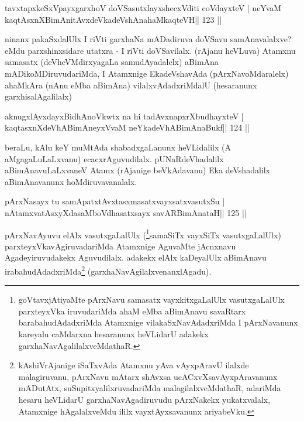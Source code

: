 \begin{shl}
tavxtapxkeSxV\s payxgarxhoV doVSasutxlayxshecxVditi coVdayxteV |
neYvaM kaqtAsxnXBimAnitAvxdeVkadeVshAnahaMkaqteVH\hfill || 123 ||
\end{shl}

\begin{artha}
ninanx pakaSxdalUlx I riVti garxhaNa mADadiruva doVSavu samAnavalalxve? eMdu parxshinxsidare utatxra - I riVti doVSavilalx. (rAjanu heVLuva) Atamxnu samasatx (deVheVMdirxyagaLa samudAyadalelx) aBimAna mADikoMDiruvudariMda, I Atamxnige EkadeVshavAda (pArxNavoMdaralelx) ahaMkAra (nAnu eMba aBimAna) vilalxvAdadxriMdalU (hesaranunx garxhisalAgalilalx) 
\end{artha} 


\begin{shl}
aknugxlAyxdayxBidhAnoVkwtx na hi tadAvxnapxrXbudhayxteV |
kaqtasxnXdeVhABimAneyxVvaM neYkadeVhABimAnaBukf\hfill || 124 ||
\end{shl}

\begin{artha}
beraLu, kAlu keY muMtAda shabadxgaLanunx heVLidalilx (A  aMgagaLuLaLxvanu) ecacxrAguvudilalx. pUNaRdeVhadalilx  aBimAnavuLaLxvaneV Atamx (rAjanige beVkAdavanu) Eka deVshadalilx aBimAnavanunx hoMdiruvavanalalx.
\end{artha}

\begin{shl}
pArxNasayx tu samApatxtAvxtasxmasatxvayxsatxvasutxSu |
nA\s\s tamxvatAsxyXdasaMboVdhasatxsayx savARBimAnataH\hfill || 125 ||
\end{shl}

\begin{artha}
pArxNavAyuvu elAlx vasutxgaLalUlx (\footnote[13]{goVtavxjAtiyaMte  pArxNavu samasatx vayxkitxgaLalUlx vasutxgaLalUlx parxteyxVka iruvudariMda ahaM eMba aBimAnavu savaRtarx barabahudAdadxriMda Atamxnige vilakaSxNavAdadxriMda I pArxNavanunx kareyalu caMdarxna hesaranunx heVLidarU adakekx garxhaNavAgalilalxveMdathaR.}samaSiTx vayxSiTx vasutxgaLalUlx) parxteyxVkavAgiruvadariMda Atamxnige AguvaMte jAcnxnavu Agadeyiruvudakekx Aguvudilalx. adakekx elAlx kaDeyalUlx aBimAnavu irabahudAdadxriMda\footnote[14]{kAshiVrAjanige iSaTxvAda Atamxnu yAva vAyxpAravU ilalxde malagiruvanu, pArxNavu mAtarx shAvxsa ucACxvXsavAyxpAravanunx mADutAtx, suSupitxyalilxruvadariMda malagilalxveMdathaR, adariMda hesaru heVLidarU garxhaNavAgadiruvudu pArxNakekx yukatxvalalx, Atamxnige hAgalalxveMdu ililx vayxtAyxsavanunx ariyabeVku.} (garxhaNavAgilalxvenanxlAgadu).
\end{artha}

